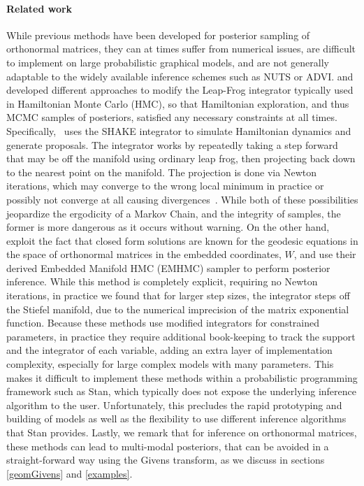 \documentclass{article}
\begin{document}
\paragraph{Related work} While previous methods have been developed for posterior sampling of orthonormal matrices, they can at times suffer from numerical issues, are difficult to implement on large probabilistic graphical models, and are not generally adaptable to the widely available inference schemes such as NUTS or ADVI. \citet{brubaker2012family} and \citet{byrne2013geodesic} developed different approaches to modify the Leap-Frog integrator typically used in Hamiltonian Monte Carlo (HMC), so that Hamiltonian exploration, and thus MCMC samples of posteriors, satisfied any necessary constraints at all times. Specifically,~\citet{brubaker2012family} uses the SHAKE integrator \citep{leimkuhler2004simulating} to simulate Hamiltonian dynamics and generate proposals. The integrator works by repeatedly taking a step forward that may be off the manifold using ordinary leap frog, then projecting back down to the nearest point on the manifold. The projection is done via Newton iterations, which may converge to the wrong local minimum in practice or possibly not converge at all causing divergences~\citep{betancourt2017divergences}. While both of these possibilities jeopardize the ergodicity of a Markov Chain, and the integrity of samples, the former is more dangerous as it occurs without warning. On the other hand, \citet{byrne2013geodesic}~ exploit the fact that closed form solutions are known for the geodesic equations in the space of orthonormal matrices in the embedded coordinates, $W$, and use their derived Embedded Manifold HMC (EMHMC) sampler to perform posterior inference. While this method is completely explicit, requiring no Newton iterations, in practice we found that for larger step sizes, the integrator steps off the Stiefel manifold, due to the numerical imprecision of the matrix exponential function. Because these methods use modified integrators for constrained parameters, in practice they require additional book-keeping to track the support and the integrator of each variable, adding an extra layer of implementation complexity, especially for large complex models with many parameters.  This makes it difficult to implement these methods within a probabilistic programming framework such as Stan, which typically does not expose the underlying inference algorithm to the user. Unfortunately, this precludes the rapid prototyping and building of models as well as the flexibility to use different inference algorithms that Stan provides. Lastly, we remark that for inference on orthonormal matrices, these methods can lead to multi-modal posteriors, that can be avoided in a straight-forward way using the Givens transform, as we discuss in sections \ref{geomGivens} and \ref{examples}.
\end{document}
